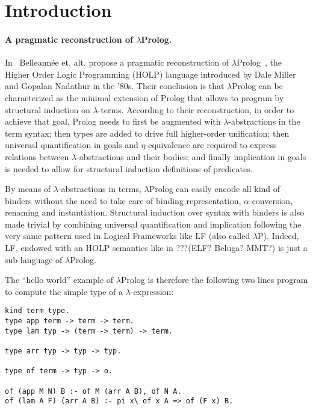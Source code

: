 \documentclass{easychair}
\begin{document}
\section{Introduction}\label{sec:introduction}

\paragraph{A pragmatic reconstruction of $\lambda$Prolog.}

In~\cite{jlp98} Belleannée et. alt. propose a pragmatic reconstruction
of $\lambda$Prolog~\cite{lambdap1,lambdap2,lambdap3}, the Higher Order
Logic Programming (HOLP) language introduced by Dale Miller and
Gopalan Nadathur in the '80s.
Their conclusion is that $\lambda$Prolog can be characterized as the
minimal extension of Prolog that allows to program by structural
induction on $\lambda$-terms. According to their reconstruction, in
order to achieve that goal, Prolog needs to first be augmented with
$\lambda$-abstractions in the term syntax; then types are added to
drive full higher-order unification; then universal quantification in
goals and $\eta$-equivalence are required to express relations between
$\lambda$-abstractions and their bodies; and finally implication in
goals is needed to allow for structural induction definitions of
predicates.

By means of $\lambda$-abstractions in terms, $\lambda$Prolog can
easily encode all kind of binders without the need to take care of
binding representation, $\alpha$-conversion, renaming and
instantiation. Structural induction over syntax with binders is also
made trivial by combining universal quantification and implication
following the very same pattern used in Logical Frameworks like LF
(also called $\lambda$P). Indeed, LF, endowed with an HOLP semantics
like in ???(ELF? Beluga? MMT?) is just a sub-language of
$\lambda$Prolog.

The ``hello world'' example of $\lambda$Prolog is therefore the
following two lines program to compute the simple type of a
$\lambda$-expression:

\begin{verbatim}
kind term type.
type app term -> term -> term.
type lam typ -> (term -> term) -> term.

type arr typ -> typ -> typ.

type of term -> typ -> o.

of (app M N) B :- of M (arr A B), of N A.
of (lam A F) (arr A B) :- pi x\ of x A => of (F x) B.
\end{verbatim}
\end{document}
